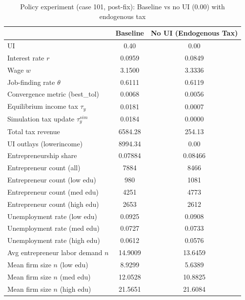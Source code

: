 \begin{table}[H]
\caption{Policy experiment (case 101, post-fix): Baseline vs no UI (0.00) with endogenous tax}
\label{tab:exp_noui_endogtax_case101_postfix}
\centering
\small
\begin{tabular}{|l|c|c|}
\hline
 & Baseline & No UI (Endogenous Tax) \\
\hline
UI & 0.40 & 0.00 \\
\hline
Interest rate $r$ & 0.0959 & 0.0849 \\
\hline
Wage $w$ & 3.1500 & 3.3336 \\
\hline
Job-finding rate $\theta$ & 0.6111 & 0.6119 \\
\hline
Convergence metric (best\_tol) & 0.0068 & 0.0056 \\
\hline
Equilibrium income tax $\tau_y$ & 0.0181 & 0.0007 \\
\hline
Simulation tax update $\tau_y^{sim}$ & 0.0184 & 0.0000 \\
\hline
Total tax revenue & 6584.28 & 254.13 \\
\hline
UI outlays (lowerincome) & 8994.34 & 0.00 \\
\hline
Entrepreneurship share & 0.07884 & 0.08466 \\
\hline
Entrepreneur count (all) & 7884 & 8466 \\
\hline
Entrepreneur count (low edu) & 980 & 1081 \\
\hline
Entrepreneur count (med edu) & 4251 & 4773 \\
\hline
Entrepreneur count (high edu) & 2653 & 2612 \\
\hline
Unemployment rate (low edu) & 0.0925 & 0.0908 \\
\hline
Unemployment rate (med edu) & 0.0727 & 0.0733 \\
\hline
Unemployment rate (high edu) & 0.0612 & 0.0576 \\
\hline
Avg entrepreneur labor demand $n$ & 14.9009 & 13.6459 \\
\hline
Mean firm size $n$ (low edu) & 8.9299 & 5.6389 \\
\hline
Mean firm size $n$ (med edu) & 12.0528 & 10.8825 \\
\hline
Mean firm size $n$ (high edu) & 21.5651 & 21.6084 \\
\hline
\end{tabular}
\end{table}
